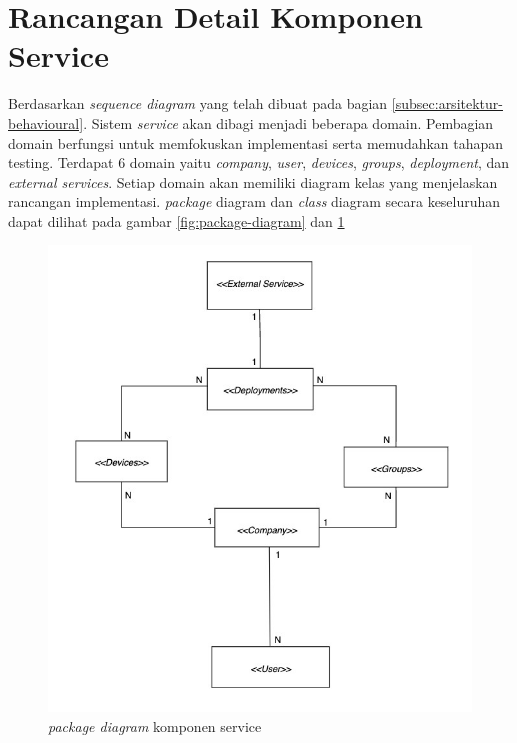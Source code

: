 \section{Rancangan Detail Komponen Service}
\label{sec:rancangan-service}

Berdasarkan \textit{sequence diagram} yang telah dibuat pada bagian \ref{subsec:arsitektur-behavioural}. Sistem \textit{service} akan dibagi menjadi beberapa domain. Pembagian domain berfungsi untuk memfokuskan implementasi serta memudahkan tahapan testing. Terdapat 6 domain yaitu \textit{company}, \textit{user}, \textit{devices}, \textit{groups}, \textit{deployment}, dan \textit{external services}. Setiap domain akan memiliki diagram kelas yang menjelaskan rancangan implementasi. \textit{package} diagram dan \textit{class} diagram secara keseluruhan dapat dilihat pada gambar \ref{fig:package-diagram} dan \ref{fig:package-class-domain-diagram}
\begin{figure}[ht]
  \centering
  \includegraphics[width=1\textwidth]{resources/chapter-3/class/class-diagram-overall.jpg}
  \caption{\textit{package diagram} komponen service}
  \label{fig:package-class-domain-diagram}
\end{figure}


